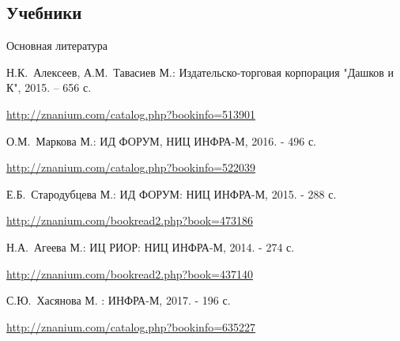 \documentclass[_Banking_p1.tex]{subfiles}
\begin{document}
\subsection*{Учебники}



\begin{frame}[allowframebreaks]{Основная литература}
    
  \begin{thebibliography}{10}
    
  \beamertemplatebookbibitems

Н.К.~Алексеев, А.М.~Тавасиев  
\newblock М.: Издательско-торговая корпорация "Дашков и К", 2015. – 656 с.

\footnotesize{\url{http://znanium.com/catalog.php?bookinfo=513901}}

О.М.~Маркова 
\newblock М.: ИД ФОРУМ, НИЦ ИНФРА-М, 2016. - 496 с. 

\footnotesize{\url{http://znanium.com/catalog.php?bookinfo=522039}}

 
  Е.Б.~Стародубцева
\newblock М.: ИД ФОРУМ: НИЦ ИНФРА-М, 2015. - 288 с.

\footnotesize{\url{http://znanium.com/bookread2.php?book=473186 }}
  \pagebreak  

Н.А.~Агеева
\newblock М.: ИЦ РИОР: НИЦ ИНФРА-М, 2014. - 274 с.

\footnotesize{\url{http://znanium.com/bookread2.php?book=437140}}

С.Ю.~Хасянова
\newblock М. : ИНФРА-М, 2017. - 196 с.

\footnotesize{\url{http://znanium.com/catalog.php?bookinfo=635227}}

  \end{thebibliography}
\end{frame}
\end{document}
